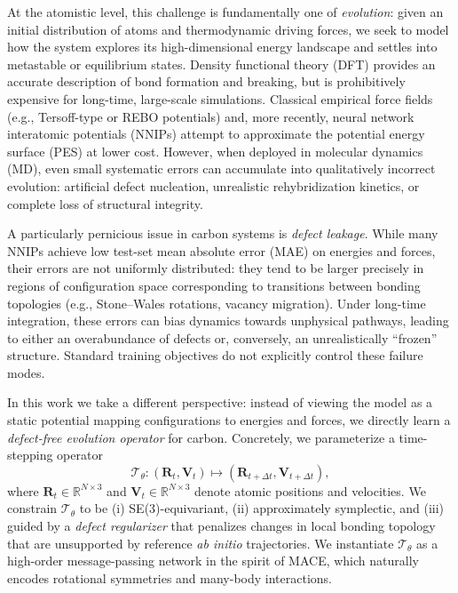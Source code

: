 \documentclass{article}
\begin{document}
At the atomistic level, this challenge is fundamentally one of \emph{evolution}: given an initial distribution of atoms and thermodynamic driving forces, we seek to model how the system explores its high-dimensional energy landscape and settles into metastable or equilibrium states. Density functional theory (DFT) provides an accurate description of bond formation and breaking, but is prohibitively expensive for long-time, large-scale simulations. Classical empirical force fields (e.g., Tersoff-type or REBO potentials) and, more recently, neural network interatomic potentials (NNIPs) attempt to approximate the potential energy surface (PES) at lower cost. However, when deployed in molecular dynamics (MD), even small systematic errors can accumulate into qualitatively incorrect evolution: artificial defect nucleation, unrealistic rehybridization kinetics, or complete loss of structural integrity.

A particularly pernicious issue in carbon systems is \emph{defect leakage}. While many NNIPs achieve low test-set mean absolute error (MAE) on energies and forces, their errors are not uniformly distributed: they tend to be larger precisely in regions of configuration space corresponding to transitions between bonding topologies (e.g., Stone--Wales rotations, vacancy migration). Under long-time integration, these errors can bias dynamics towards unphysical pathways, leading to either an overabundance of defects or, conversely, an unrealistically ``frozen'' structure. Standard training objectives do not explicitly control these failure modes.

In this work we take a different perspective: instead of viewing the model as a static potential mapping configurations to energies and forces, we directly learn a \emph{defect-free evolution operator} for carbon. Concretely, we parameterize a time-stepping operator
\begin{equation}
    \mathcal{T}_\theta : \left(\mathbf{R}_t, \mathbf{V}_t\right) \mapsto \left(\mathbf{R}_{t+\Delta t}, \mathbf{V}_{t+\Delta t}\right),
\end{equation}
where $\mathbf{R}_t \in \mathbb{R}^{N \times 3}$ and $\mathbf{V}_t \in \mathbb{R}^{N \times 3}$ denote atomic positions and velocities. We constrain $\mathcal{T}_\theta$ to be (i) SE(3)-equivariant, (ii) approximately symplectic, and (iii) guided by a \emph{defect regularizer} that penalizes changes in local bonding topology that are unsupported by reference \emph{ab initio} trajectories. We instantiate $\mathcal{T}_\theta$ as a high-order message-passing network in the spirit of MACE, which naturally encodes rotational symmetries and many-body interactions.
\end{document}

